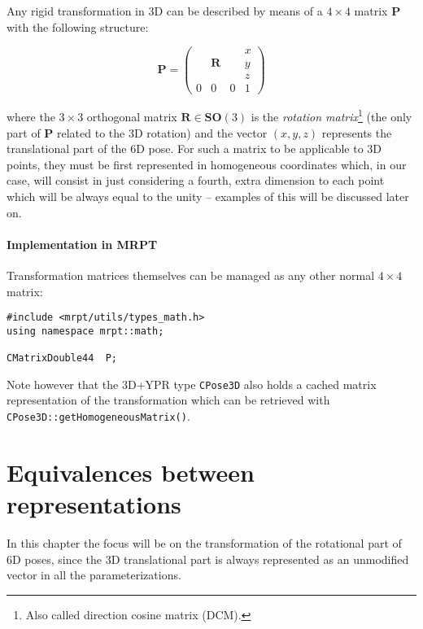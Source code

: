 \documentclass[a4paper,11pt]{report}
\begin{document}
Any rigid transformation in 3D can be described by means of a $4 \times 4$
matrix $\mathbf{P}$ with the following structure:

\begin{equation}
\mathbf{P}=\left(
  \begin{array}{ccc|c}
   & & & x \\
   & \mathbf{R} & & y \\
   & & & z \\ \hline
   0 & 0 & 0& 1
  \end{array}
\right)
\end{equation}

\noindent where the $3 \times 3$ orthogonal matrix $\mathbf{R} \in \mathbf{SO}(3)$
is the \emph{rotation matrix}\footnote{Also called direction cosine matrix (DCM).}
(the only part of $\mathbf{P}$ related to
the 3D rotation) and the vector $(x,y,z)$ represents the translational part of the 6D pose.
For such a matrix to be applicable to 3D points, they must be first represented in
homogeneous coordinates \cite{bloomenthal1994homogeneous} which, in our case, will consist in just considering a fourth,
extra dimension to each point which will be always equal to the unity -- examples of this will be discussed later on.


\subsubsection{Implementation in MRPT}

Transformation matrices themselves can be managed as any other normal $4\times 4$ matrix:

\begin{lstlisting}
#include <mrpt/utils/types_math.h>
using namespace mrpt::math;

CMatrixDouble44  P;
\end{lstlisting}

Note however that the 3D+YPR type \texttt{CPose3D} also holds a cached matrix representation
of the transformation which can be retrieved with \texttt{CPose3D::getHomogeneousMatrix()}.




\chapter{Equivalences between representations}

In this chapter the focus will be on the transformation of the rotational
part of 6D poses, since the 3D translational part is always represented as an
unmodified vector in all the parameterizations.
\end{document}

